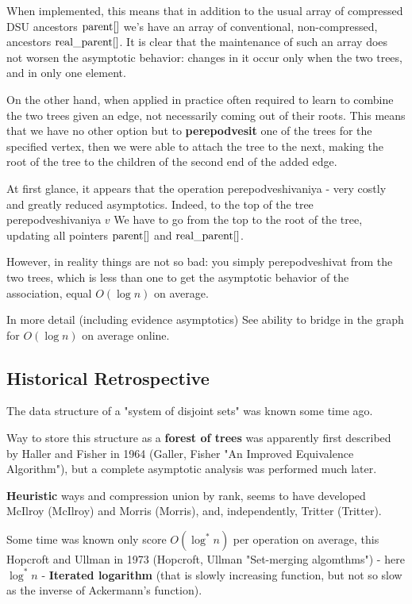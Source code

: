 When implemented, this means that in addition to the usual array of compressed DSU ancestors ${\rm parent} []$ we's have an array of conventional, non-compressed, ancestors ${\rm real \_parent} []$. It is clear that the maintenance of such an array does not worsen the asymptotic behavior: changes in it occur only when the two trees, and in only one element.

On the other hand, when applied in practice often required to learn to combine the two trees given an edge, not necessarily coming out of their roots. This means that we have no other option but to \textbf{perepodvesit} one of the trees for the specified vertex, then we were able to attach the tree to the next, making the root of the tree to the children of the second end of the added edge.

At first glance, it appears that the operation perepodveshivaniya - very costly and greatly reduced asymptotics. Indeed, to the top of the tree perepodveshivaniya $v$ We have to go from the top to the root of the tree, updating all pointers ${\rm parent} []$ and ${\rm real \_parent} []$.

However, in reality things are not so bad: you simply perepodveshivat from the two trees, which is less than one to get the asymptotic behavior of the association, equal $O (\log n)$ on average.

In more detail (including evidence asymptotics) See ability to bridge in the graph for $O (\log n)$ on average online.

\subsection{ Historical Retrospective }

The data structure of a "system of disjoint sets" was known some time ago.

Way to store this structure as a \textbf{forest of trees} was apparently first described by Haller and Fisher in 1964 (Galler, Fisher "An Improved Equivalence Algorithm"), but a complete asymptotic analysis was performed much later.

\textbf{Heuristic} ways and compression union by rank, seems to have developed McIlroy (McIlroy) and Morris (Morris), and, independently, Tritter (Tritter).

Some time was known only score $O (\log ^ * n)$ per operation on average, this Hopcroft and Ullman in 1973 (Hopcroft, Ullman "Set-merging algomthms") - here $\log ^ * n$ - \textbf{Iterated logarithm} (that is slowly increasing function, but not so slow as the inverse of Ackermann's function).

